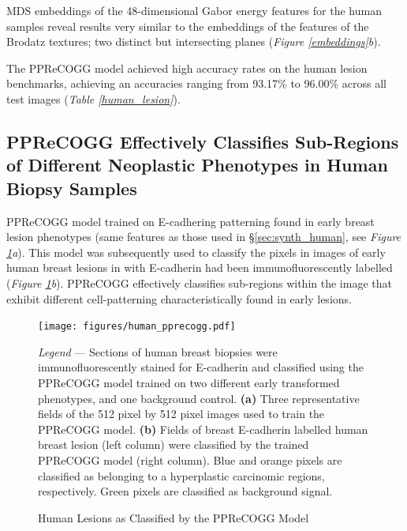 MDS embeddings of the 48-dimensional Gabor energy features for the human samples reveal results very similar to the embeddings of the features of the Brodatz textures; two distinct but intersecting planes (\textit{Figure \ref{embeddings}b}).\par

The PPReCOGG model achieved high accuracy rates on the human lesion benchmarks, achieving an accuracies ranging from 93.17\% to 96.00\% across all test images (\textit{Table \ref{human_lesion}}).\par

\subsection{PPReCOGG Effectively Classifies Sub-Regions of Different Neoplastic Phenotypes in Human Biopsy Samples}

PPReCOGG model trained on E-cadhering patterning found in early breast lesion phenotypes (same features as those used in \S\ref{sec:synth_human}, see \textit{Figure \ref{fig:pprecogg_human_lesion}a}). This model was subsequently used to classify the pixels in images of early human breast lesions in with \mbox{E-cadherin} had been immunofluorescently labelled (\textit{Figure \ref{fig:pprecogg_human_lesion}b}). PPReCOGG effectively classifies sub-regions within the image that exhibit different cell-patterning characteristically found in early lesions.\par

\newpage

\begin{figure}[ht!]
	\begin{center}
		\caption{Human Lesions as Classified by the PPReCOGG Model \label{fig:pprecogg_human_lesion}}
	\end{center}
	\texttt{[image: figures/human\_pprecogg.pdf]}
	\begin{singlespace}
		\textit{Legend} --- Sections of human breast biopsies were immunofluorescently stained for E-cadherin and classified using the PPReCOGG model trained on two different early transformed phenotypes, and one background control. \textbf{(a)} Three representative fields of the 512 pixel by 512 pixel images used to train the PPReCOGG model. \textbf{(b)} Fields of breast E-cadherin labelled human breast lesion (left column) were classified by the trained \mbox{PPReCOGG} model (right column). Blue and orange pixels are classified as belonging to a hyperplastic carcinomic regions, respectively. Green pixels are classified as background signal.
	\end{singlespace}
	
\end{figure}
